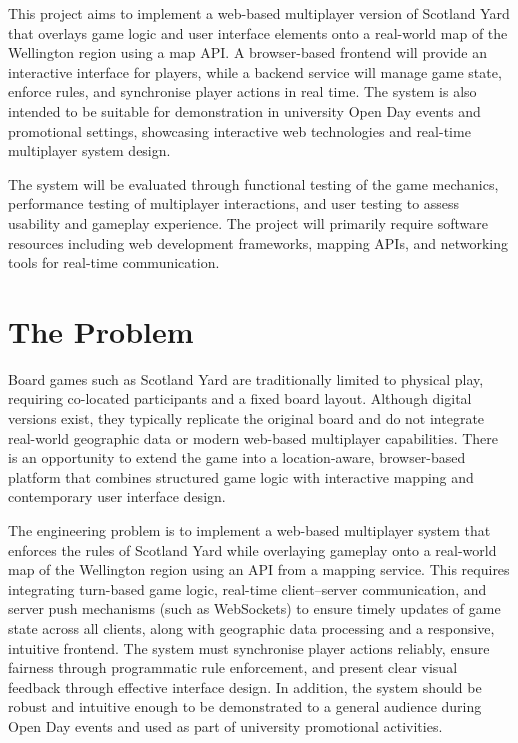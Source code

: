 \documentclass[11pt, a4paper, twoside, openright]{article}
\begin{document}
	This project aims to implement a web-based multiplayer version of Scotland Yard that overlays game logic and user interface elements onto a real-world map of the Wellington region using a map API. A browser-based frontend will provide an interactive interface for players, while a backend service will manage game state, enforce rules, and synchronise player actions in real time. The system is also intended to be suitable for demonstration in university Open Day events and promotional settings, showcasing interactive web technologies and real-time multiplayer system design.
	
	The system will be evaluated through functional testing of the game mechanics, performance testing of multiplayer interactions, and user testing to assess usability and gameplay experience. The project will primarily require software resources including web development frameworks, mapping APIs, and networking tools for real-time communication.
	
	\section{The Problem}
	
	Board games such as Scotland Yard are traditionally limited to physical play, requiring co-located participants and a fixed board layout. Although digital versions exist, they typically replicate the original board and do not integrate real-world geographic data or modern web-based multiplayer capabilities. There is an opportunity to extend the game into a location-aware, browser-based platform that combines structured game logic with interactive mapping and contemporary user interface design.
	
	The engineering problem is to implement a web-based multiplayer system that enforces the rules of Scotland Yard while overlaying gameplay onto a real-world map of the Wellington region using an API from a mapping service. This requires integrating turn-based game logic, real-time client--server communication, and server push mechanisms (such as WebSockets) to ensure timely updates of game state across all clients, along with geographic data processing and a responsive, intuitive frontend. The system must synchronise player actions reliably, ensure fairness through programmatic rule enforcement, and present clear visual feedback through effective interface design. In addition, the system should be robust and intuitive enough to be demonstrated to a general audience during Open Day events and used as part of university promotional activities.
	
\end{document}
